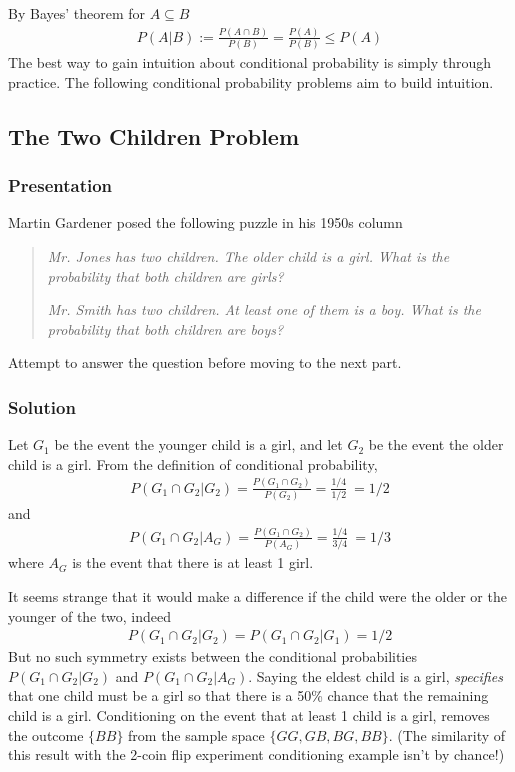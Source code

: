 \documentclass[11pt,a4paper]{article}
\begin{document}
By Bayes' theorem for \(A \subseteq B\)
\begin{align}
P(A|B) := \frac{P(A\cap B)}{P(B)} = \frac{P(A)}{P(B)} \leq P(A)
\end{align}
The best way to gain intuition about conditional probability is simply through practice. 
The following conditional probability problems aim to build intuition.

\subsection{The Two Children Problem}%

\subsubsection{Presentation}

Martin Gardener posed the following puzzle in his 1950s column

\begin{quote}
\emph{Mr. Jones has two children. The older child is a girl. What is the
probability that both children are girls?}

\emph{Mr. Smith has two children. At least one of them is a boy. What is
the probability that both children are boys?}
\end{quote}

Attempt to answer the question before moving to the next part.

\clearpage
\subsubsection{Solution}

Let \(G_{1}\) be the event the younger child is a girl,
and let \(G_{2}\) be the event the older child is a girl. 
From the definition of conditional probability,
\begin{align}
P\left( G_{1} \cap G_{2} | G_{2} \right) = 
\frac{P\left( G_{1} \cap G_{2} \right)}{P\left( G_{2} \right)} = \frac{1/4}{1/2}\  = 1/2
\end{align}
and
\begin{align}
P\left( G_{1} \cap G_{2} | A_{G} \right) = 
\frac{P\left( G_{1} \cap G_{2} \right)}{P\left( A_{G} \right)} = \frac{1/4}{3/4}\  = 1/3
\end{align}
where \(A_{G}\) is the event that there is at least 1 girl.

It seems strange that it would make a difference if the child were the
older or the younger of the two, 
indeed
\begin{align}
P\left( G_{1} \cap G_{2} | G_{2} \right) = P\left( G_{1} \cap G_{2} | G_{1} \right) = 1/2
\end{align}
But no such symmetry exists between the conditional probabilities
\(P\left( G_{1} \cap G_{2} | G_{2} \right)\) and
\(P\left( G_{1} \cap G_{2} | A_{G} \right)\). 
Saying the eldest child is a girl, 
\emph{specifies} that one child must be a girl so that there is a 50\% chance that the remaining child is a girl. 
Conditioning on the event that at least 1 child is a girl, 
removes the outcome \(\{ BB\}\) from the sample space \(\{GG, GB, BG, BB\}\). 
(The similarity of this result with the 2-coin flip experiment conditioning example isn't by chance!)
\end{document}
